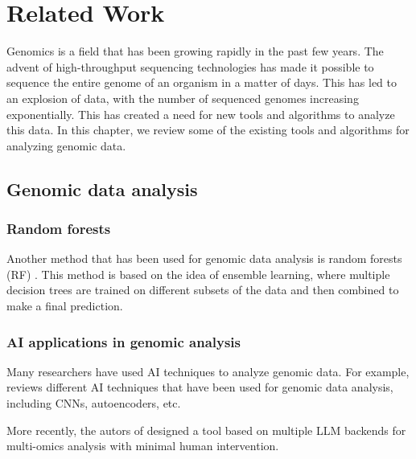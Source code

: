 \chapter{Related Work}
\label{chap:related-work}

Genomics is a field that has been growing rapidly in the past few years. The advent of high-throughput
sequencing technologies has made it possible to sequence the entire genome of an organism in a matter
of days. This has led to an explosion of data, with the number of sequenced genomes increasing exponentially.
This has created a need for new tools and algorithms to analyze this data. In this chapter, we review 
some of the existing tools and algorithms for analyzing genomic data.

\section{Genomic data analysis}
\label{sec:genomic-data-analysis}

\subsection*{Random forests}
\label{subsec:random-forests}

Another method that has been used for genomic data analysis is random forests (RF) \cite{Chen-Ishwaran-2012}.
This method is based on the idea of ensemble learning, where multiple decision trees are trained on different
subsets of the data and then combined to make a final prediction.

\subsection*{AI applications in genomic analysis}
\label{sec:ai-applications-in-genomic-analysis}

Many researchers have used AI techniques to analyze genomic data. For example, \cite{Caudai-et-al-2021} reviews
different AI techniques that have been used for genomic data analysis, including CNNs, autoencoders, etc.

More recently, the autors of \cite{Zhou-et-al-2024} designed a tool based on multiple LLM backends for multi-omics
analysis with minimal human intervention.